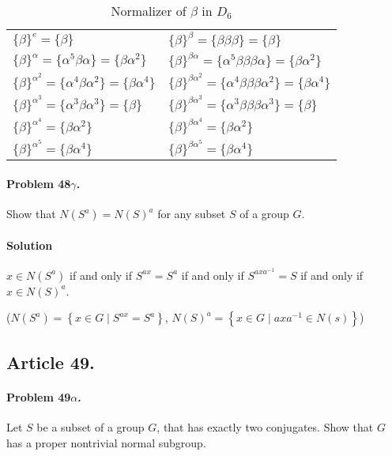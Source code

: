 \begin{table}[ht]
\begin{center}
\begin{tabular}[ht]{ll}
$\{\beta\}^e = \{\beta\}$  &
  $\{\beta\}^\beta = \{\beta \beta \beta\} = \{ \beta \}$ \\
$\{\beta\}^{\alpha} = \{\alpha^5 \beta \alpha\} = \{\beta\alpha^2\}$
  &  $\{\beta\}^{\beta\alpha} = \{\alpha^5\beta \beta \beta\alpha\} = \{\beta\alpha^2\}$ \\
$\{\beta\}^{\alpha^2} = \{\alpha^4 \beta \alpha^2\} = \{\beta\alpha^4\}$
  &  $\{\beta\}^{\beta\alpha^2} = \{\alpha^4 \beta \beta \beta \alpha^2\} = \{\beta\alpha^4\}$ \\
$\{\beta\}^{\alpha^3} = \{\alpha^3 \beta \alpha^3\} = \{\beta\}$
  &  $\{\beta\}^{\beta\alpha^3} = \{\alpha^3 \beta \beta \beta \alpha^3\} = \{\beta\}$ \\
$\{\beta\}^{\alpha^4} = \{\beta\alpha^2\}$
  &  $\{\beta\}^{\beta\alpha^4} = \{\beta\alpha^2\}$ \\
$\{\beta\}^{\alpha^5} = \{\beta\alpha^4\}$
  &  $\{\beta\}^{\beta\alpha^5} = \{\beta\alpha^4\}$ \\
\end{tabular}
\end{center}
\caption{Normalizer of $\beta$ in $D_6$}
\label{table:normalizers2_in_d6}
\end{table}

\paragraph{Problem 48$\gamma$.}
Show that $N(S^a) = N(S)^a$ for any subset $S$ of a group $G$.

\paragraph*{Solution}
$x \in N(S^a)$ if and only if $S^{ax} = S^a$ if and only if $S^{axa^{-1}} = S$
if and only if $x \in N(S)^a$.

($N(S^a) = \left\{ x \in G \mid S^{ax} = S^a \right\}$,
$N(S)^a = \left\{ x \in G \mid axa^{-1} \in N(s) \right\}$)

\subsection{Article 49.}

\paragraph{Problem 49$\alpha$.}
Let $S$ be a subset of a group $G$, that has exactly two conjugates. Show that
$G$ has a proper nontrivial normal subgroup.

